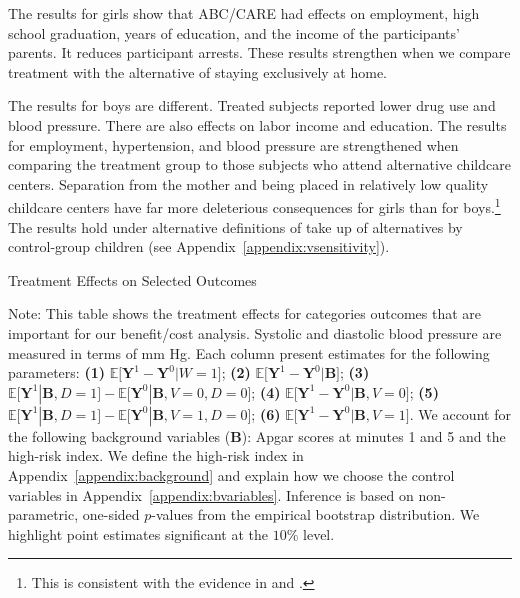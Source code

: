 The results for girls show that ABC/CARE had effects on employment, high school graduation, years of education, and the income of the participants' parents. It reduces participant arrests. These results strengthen when we compare treatment with the alternative of staying exclusively at home.

The results for boys are different. Treated subjects reported lower drug use and blood pressure. There are also effects on labor income and education. The results for employment, hypertension, and blood pressure are strengthened when comparing the treatment group to those subjects who attend alternative childcare centers. Separation from the mother and being placed in relatively low quality childcare centers have far more deleterious consequences for girls than for boys.\footnote{This is consistent with the evidence in \citet{Baker_Gruber_Milligan_2015_Noncog_Defects} and \citet{Kottelenberg-Lehrer_2014_Gender-Effects}.} The results hold under alternative definitions of take up of alternatives by control-group children (see Appendix~\ref{appendix:vsensitivity}).

\begin{table}[!htbp]
\centering
\begin{threeparttable}
\caption{Treatment Effects on Selected Outcomes}\label{table:tescombined}
\begin{scriptsize}

\end{scriptsize}
\begin{tablenotes}
\tiny
Note: This table shows the treatment effects for categories outcomes that are important for our benefit/cost analysis. Systolic and diastolic blood pressure are measured in terms of mm Hg. Each column present estimates for the following parameters: \textbf{(1)} $\mathbb{E} \big[ \bm{Y}^1 - \bm{Y}^0 | W = 1]$; {\textbf{(2)} $\mathbb{E} \big[ \bm{Y}^1 - \bm{Y}^0 | \bm{B} \big]$}; {\textbf{(3)} $\mathbb{E} \big[ \bm{Y}^1 | \bm{B}, D=1 \big] - \mathbb{E} \big[ \bm{Y}^0 | \bm{B}, V=0, D=0 \big]$}; {\textbf{(4)} $\mathbb{E} \big[ \bm{Y}^1 - \bm{Y}^0 | \bm{B}, V=0 \big] $}; {\textbf{(5)} $\mathbb{E} \big[ \bm{Y}^1 | \bm{B}, D=1 \big] - \mathbb{E} \big[ \bm{Y}^0 | \bm{B}, V=1, D = 0 \big]$}; {\textbf{(6)} $\mathbb{E} \big[ \bm{Y}^1 - \bm{Y}^0 | \bm{B}, V=1 \big]$}. We account for the following background variables ($\bm{B}$): Apgar scores at minutes 1 and 5 and the high-risk index. We define the high-risk index in Appendix~\ref{appendix:background} and explain how we choose the control variables in Appendix~\ref{appendix:bvariables}. Inference is based on non-parametric, one-sided $p$-values from the empirical bootstrap distribution. We highlight point estimates significant at the $10\%$ level.
\end{tablenotes}
\end{threeparttable}
\end{table}
\restoregeometry
\doublespacing

